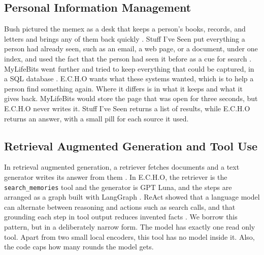 \documentclass[conference]{IEEEtran}
\newcommand{\llmname}{GPT\nobreakdash-6 Luna}
\begin{document}
\subsection{Personal Information Management}
Bush pictured the memex as a desk that keeps a person's books, records, and letters and brings any of them back quickly \cite{b1}. Stuff I've Seen put everything a person had already seen, such as an email, a web page, or a document, under one index, and used the fact that the person had seen it before as a cue for search \cite{b2}. MyLifeBits went further and tried to keep everything that could be captured, in a SQL database \cite{b3}. E.C.H.O wants what these systems wanted, which is to help a person find something again. Where it differs is in what it keeps and what it gives back. MyLifeBits would store the page that was open for three seconds, but E.C.H.O never writes it. Stuff I've Seen returns a list of results, while E.C.H.O returns an answer, with a small pill for each source it used.

\subsection{Retrieval Augmented Generation and Tool Use}
In retrieval augmented generation, a retriever fetches documents and a text generator writes its answer from them \cite{b4}. In E.C.H.O, the retriever is the \texttt{search\_memories} tool and the generator is \llmname{}, and the steps are arranged as a graph built with LangGraph \cite{b5}. ReAct showed that a language model can alternate between reasoning and actions such as search calls, and that grounding each step in tool output reduces invented facts \cite{b13}. We borrow this pattern, but in a deliberately narrow form. The model has exactly one read only tool. Apart from two small local encoders, this tool has no model inside it. Also, the code caps how many rounds the model gets.
\end{document}
